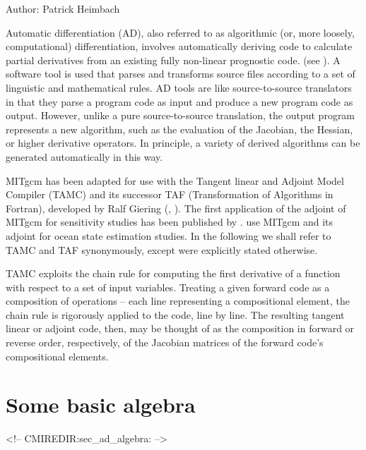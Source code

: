 
Author: Patrick Heimbach

{\sf Automatic differentiation} (AD), also referred to as algorithmic
(or, more loosely, computational) differentiation, involves
automatically deriving code to calculate partial derivatives from an
existing fully non-linear prognostic code.  (see \cite{gri:00}).  A
software tool is used that parses and transforms source files
according to a set of linguistic and mathematical rules.  AD tools are
like source-to-source translators in that they parse a program code as
input and produce a new program code as output.  However, unlike a
pure source-to-source translation, the output program represents a new
algorithm, such as the evaluation of the Jacobian, the Hessian, or
higher derivative operators.  In principle, a variety of derived
algorithms can be generated automatically in this way.

MITgcm has been adapted for use with the Tangent linear and Adjoint
Model Compiler (TAMC) and its successor TAF (Transformation of
Algorithms in Fortran), developed by Ralf Giering (\cite{gie-kam:98},
\cite{gie:99,gie:00}).  The first application of the adjoint of MITgcm
for sensitivity studies has been published by \cite{maro-eta:99}.
\cite{sta-eta:97,sta-eta:01} use MITgcm and its adjoint for ocean
state estimation studies.  In the following we shall refer to TAMC and
TAF synonymously, except were explicitly stated otherwise.

TAMC exploits the chain rule for computing the first derivative of a
function with respect to a set of input variables.  Treating a given
forward code as a composition of operations -- each line representing
a compositional element, the chain rule is rigorously applied to the
code, line by line. The resulting tangent linear or adjoint code,
then, may be thought of as the composition in forward or reverse
order, respectively, of the Jacobian matrices of the forward code's
compositional elements.

\section{Some basic algebra}
\label{sec_ad_algebra}
\begin{rawhtml}
<!-- CMIREDIR:sec_ad_algebra: -->
\end{rawhtml}

